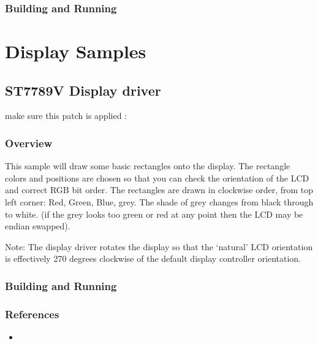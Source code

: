 \documentclass[letterpaper,10pt,english]{sphinxmanual}
\begin{document}
\subsubsection{Building and Running}
\label{\detokenize{samples/drivers/i2c_scanner/README:building-and-running}}

\section{Display Samples}
\label{\detokenize{samples/display/display:display-samples}}\label{\detokenize{samples/display/display:id1}}\label{\detokenize{samples/display/display::doc}}

\subsection{ST7789V Display driver}
\label{\detokenize{samples/display/st7789v/README:st7789v-display-driver}}\label{\detokenize{samples/display/st7789v/README:st7789v-sample}}\label{\detokenize{samples/display/st7789v/README::doc}}
make sure this patch is applied :


\subsubsection{Overview}
\label{\detokenize{samples/display/st7789v/README:overview}}
This sample will draw some basic rectangles onto the display.
The rectangle colors and positions are chosen so that you can check the
orientation of the LCD and correct RGB bit order. The rectangles are drawn
in clockwise order, from top left corner: Red, Green, Blue, grey. The shade of
grey changes from black through to white. (if the grey looks too green or red
at any point then the LCD may be endian swapped).

Note: The display driver rotates the display so that the ‘natural’ LCD
orientation is effectively 270 degrees clockwise of the default display
controller orientation.


\subsubsection{Building and Running}
\label{\detokenize{samples/display/st7789v/README:building-and-running}}

\subsubsection{References}
\label{\detokenize{samples/display/st7789v/README:references}}\begin{itemize}
\item {} 

\end{itemize}
\end{document}
